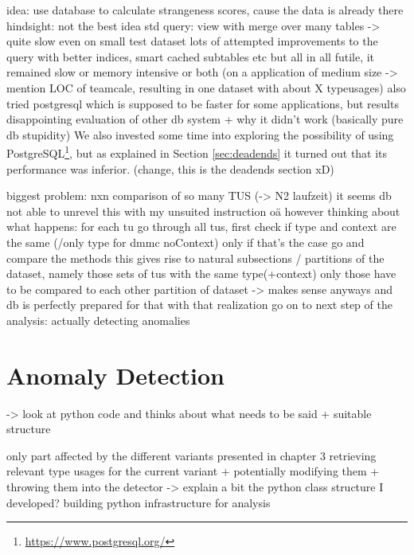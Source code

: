 
idea: use database to calculate strangeness scores, cause the data is already there
hindsight: not the best idea
std query: view with merge over many tables -> quite slow even on small test dataset
lots of attempted improvements to the query with better indices, smart cached subtables etc
but all in all futile, it remained slow or memory intensive or both (on a application of medium size -> mention LOC of teamcale, resulting in one dataset with about X typeusages)
also tried postgresql which is supposed to be faster for some applications, but results disappointing
evaluation of other db system + why it didn't work (basically pure db stupidity)
We also invested some time into exploring the possibility of using PostgreSQL\footnote{\url{https://www.postgresql.org/}}, but as explained in Section \ref{sec:deadends} it turned out that its performance was inferior. (change, this is the deadends section xD)

biggest problem: nxn comparison of so many TUS (-> N2 laufzeit)
it seems db not able to unrevel this with my unsuited instruction oä
however thinking about what happens:
for each tu go through all tus, first check if type and context are the same (/only type for dmmc noContext)
only if that's the case go and compare the methods
this gives rise to natural subsections / partitions of the dataset, namely those sets of tus with the same type(+context)
only those have to be compared to each other
partition of dataset -> makes sense anyways and db is perfectly prepared for that
with that realization go on to next step of the analysis: actually detecting anomalies

\section{Anomaly Detection}\label{sec:anomaly}

-> look at python code and thinks about what needs to be said + suitable structure


only part affected by the different variants presented in chapter 3
retrieving relevant type usages for the current variant + potentially modifying them + throwing them into the detector
-> explain a bit the python class structure I developed?
        building python infrastructure for analysis

